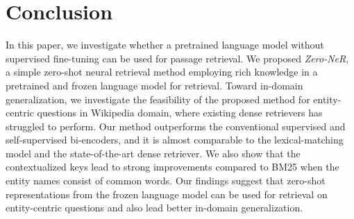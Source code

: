 \documentclass[letterpaper]{article} %
\begin{document}
\section{Conclusion}
In this paper, we investigate whether a pretrained language model without supervised fine-tuning can be used for passage retrieval.
We proposed \textit{Zero-NeR}, a simple zero-shot neural retrieval method employing rich knowledge in a pretrained and frozen language model for retrieval.
Toward in-domain generalization, we investigate the feasibility of the proposed method for entity-centric questions in Wikipedia domain, where existing dense retrievers has struggled to perform.
Our method outperforms the conventional supervised and self-supervised bi-encoders, and it is almost comparable to the lexical-matching model and the state-of-the-art dense retriever.
We also show that the contextualized keys lead to strong improvements compared to BM25 when the entity names consist of common words.
Our findings suggest that zero-shot representations from the frozen language model can be used for retrieval on entity-centric questions and also lead better in-domain generalization.





\end{document}
